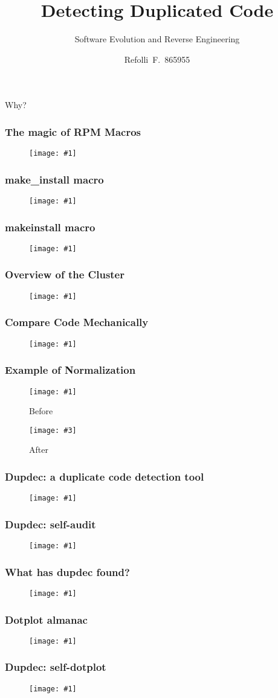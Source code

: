 \documentclass{beamer}
\title{Detecting Duplicated Code}
\subtitle{Software Evolution and Reverse Engineering}
\author{Refolli~F.~865955}
\newcommand{\putimage}[2] {
  \begin{figure}[H]
    \centering
    \texttt{[image: \#1]}
	\end{figure}
}
\newcommand{\putimagecouple}[4] {
  \begin{figure}[!htb]
    \centering
    \begin{minipage}{0.45\linewidth}
      \centering
      \texttt{[image: \#1]}
      \caption{#2}
    \end{minipage}
    \hspace{0.25cm}
    \begin{minipage}{0.45\linewidth}
      \centering
      \texttt{[image: \#3]}
      \caption{#4}
    \end{minipage}
  \end{figure}
}
\begin{document}
\frame{\titlepage}

\begin{frame}
\centering
\Huge
Why?
\end{frame}

\begin{frame}
\frametitle{The magic of RPM Macros}
  \putimage{images/packer-spec.png}{0.80}
\end{frame}

\begin{frame}
\frametitle{make\_install macro}
  \putimage{images/make-install-macro.png}{0.99}
\end{frame}

\begin{frame}
\frametitle{makeinstall macro}
  \putimage{images/makeinstall-macro.png}{0.99}
\end{frame}

\begin{frame}
\frametitle{Overview of the Cluster}
  \putimage{images/cluster.png}{0.85}
\end{frame}

\begin{frame}
\frametitle{Compare Code Mechanically}
  \putimage{images/mechanical-compare-process.png}{0.99}
\end{frame}

\begin{frame}
\frametitle{Example of Normalization}
  \putimagecouple{images/before-normalization.png}{Before}{images/after-normalization.png}{After}
\end{frame}

\begin{frame}
\frametitle{Dupdec: a duplicate code detection tool}
  \putimage{images/dupdec-py-help.png}{0.99}
\end{frame}

\begin{frame}
\frametitle{Dupdec: self-audit}
  \putimage{images/result-of-mechanical-on-dupdec.png}{0.99}
\end{frame}

\begin{frame}
\frametitle{What has dupdec found?}
  \putimage{images/duplicate-detected.png}{0.99}
\end{frame}

\begin{frame}
\frametitle{Dotplot almanac}
  \putimage{images/dotplot-almanac.png}{0.99}
\end{frame}

\begin{frame}
\frametitle{Dupdec: self-dotplot}
  \putimage{images/result-of-dotplot-on-dupdec.png}{0.90}
\end{frame}
\end{document}
